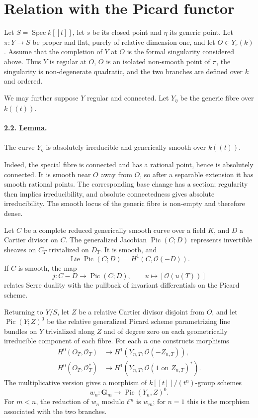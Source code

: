\documentclass[11pt]{article}
\theoremstyle{remark}
\DeclareMathOperator{\Spec}{Spec}
\DeclareMathOperator{\Lie}{Lie}
\DeclareMathOperator{\Pic}{Pic}
\newcommand{\OO}{\mathcal O}
\newcommand{\Gm}{\mathbf G_m}
\begin{document}
\section{Relation with the Picard functor}

Let $S=\Spec k[[t]]$, let $s$ be its closed point and $\eta$ its generic point. Let $\pi:Y\to S$ be proper and flat, purely of relative dimension one, and let $O\in Y_s(k)$. Assume that the completion of $Y$ at $O$ is the formal singularity considered above. Thus $Y$ is regular at $O$, $O$ is an isolated non-smooth point of $\pi$, the singularity is non-degenerate quadratic, and the two branches are defined over $k$ and ordered.

We may further suppose $Y$ regular and connected. Let $Y_\eta$ be the generic fibre over $k((t))$.

\paragraph{2.2. Lemma.}
The curve $Y_\eta$ is absolutely irreducible and generically smooth over $k((t))$.

Indeed, the special fibre is connected and has a rational point, hence is absolutely connected. It is smooth near $O$ away from $O$, so after a separable extension it has smooth rational points. The corresponding base change has a section; regularity then implies irreducibility, and absolute connectedness gives absolute irreducibility. The smooth locus of the generic fibre is non-empty and therefore dense.

Let $C$ be a complete reduced generically smooth curve over a field $K$, and $D$ a Cartier divisor on $C$. The generalized Jacobian $\Pic(C;D)$ represents invertible sheaves on $C_T$ trivialized on $D_T$. It is smooth, and
\begin{equation}\tag{2.3.1}
 \Lie\Pic(C;D)=H^1(C,\OO(-D)).
\end{equation}
If $C$ is smooth, the map
\begin{equation}\tag{2.3.2}
 j:C-D\to\Pic(C;D),\qquad u\mapsto[\OO(u(T))]
\end{equation}
relates Serre duality with the pullback of invariant differentials on the Picard scheme.

Returning to $Y/S$, let $Z$ be a relative Cartier divisor disjoint from $O$, and let $\Pic(Y;Z)^0$ be the relative generalized Picard scheme parametrizing line bundles on $Y$ trivialized along $Z$ and of degree zero on each geometrically irreducible component of each fibre. For each $n$ one constructs morphisms
\begin{align}\tag{2.4.6}
 H^0(O_T,\OO_T)&\longrightarrow H^1(Y_{n,T},\OO(-Z_{n,T})),\\
\tag{2.4.7}
 H^0(O_T,\OO_T^*)&\longrightarrow H^1(Y_{n,T},\OO(1\text{ on }Z_{n,T})^*).
\end{align}
The multiplicative version gives a morphism of $k[[t]]/(t^n)$-group schemes
\begin{equation}\tag{2.4.8}
 w_n:\Gm\longrightarrow\Pic(Y_n,Z)^0.
\end{equation}
For $m<n$, the reduction of $w_n$ modulo $t^m$ is $w_m$; for $n=1$ this is the morphism associated with the two branches.
\end{document}

